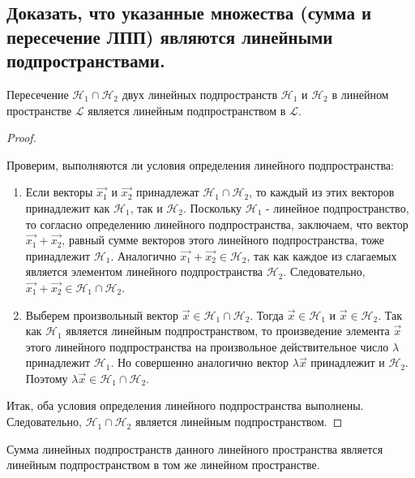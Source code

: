 \newpage


\subsection{
    Доказать, что указанные множества (сумма и пересечение ЛПП) являются линейными подпространствами.
}

\begin{theorem}
    Пересечение $\mathcal{H}_1 \cap \mathcal{H}_2$ двух линейных подпространств $\mathcal{H}_1$ и $\mathcal{H}_2$ в линейном пространстве $\mathcal{L}$ является линейным подпространством в $\mathcal{L}$.
\end{theorem}

\begin{proof}~

    Проверим, выполняются ли условия определения линейного подпространства:
    \begin{enumerate}[nosep]
        \item Если векторы $\vec{x_1}$ и $\vec{x_2}$ принадлежат $\mathcal{H}_1 \cap \mathcal{H}_2$, то каждый из этих векторов принадлежит как $\mathcal{H}_1$, так и $\mathcal{H}_2$. Поскольку $\mathcal{H}_1$ - линейное подпространство, то согласно определению линейного подпространства, заключаем, что вектор $\vec{x_1} + \vec{x_2}$, равный сумме векторов этого линейного подпространства, тоже принадлежит $\mathcal{H}_1$. Аналогично $\vec{x_1} + \vec{x_2} \in \mathcal{H}_2$, так как каждое из слагаемых является элементом линейного подпространства $\mathcal{H}_2$. Следовательно, $\vec{x_1} + \vec{x_2} \in \mathcal{H}_1 \cap \mathcal{H}_2$.
        \item Выберем произвольный вектор $\vec{x} \in \mathcal{H}_1 \cap \mathcal{H}_2$. Тогда $\vec{x} \in \mathcal{H}_1$ и $\vec{x} \in \mathcal{H}_2$. Так как $\mathcal{H}_1$ является линейным подпространством, то произведение элемента $\vec{x}$ этого линейного подпространства на произвольное действительное число $\lambda$ принадлежит $\mathcal{H}_1$. Но совершенно аналогично вектор $\lambda \vec{x}$ принадлежит и $\mathcal{H}_2$. Поэтому $\lambda \vec{x} \in \mathcal{H}_1 \cap \mathcal{H}_2$. 
    \end{enumerate}
    Итак, оба условия определения линейного подпространства выполнены. Следовательно, $\mathcal{H}_1 \cap \mathcal{H}_2$ является линейным подпространством.
\end{proof}

\begin{theorem}
    Сумма линейных подпространств данного линейного пространства является линейным подпространством в том же линейном пространстве.
\end{theorem}

